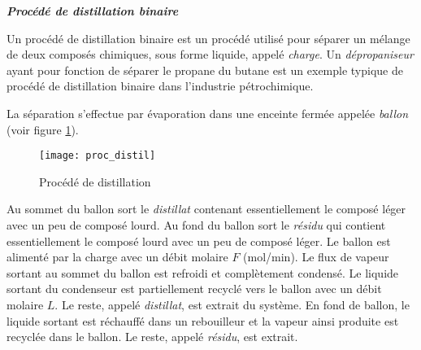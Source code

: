 \begin{exemple}{\bf \em Procédé de distillation binaire}

Un procédé de distillation binaire est un procédé utilisé pour séparer un
mélange de deux composés chimiques, sous forme liquide, appelé {\em charge}. Un {\it
dépropaniseur} ayant pour fonction de séparer le propane du butane est un
exemple typique de procédé de distillation binaire dans l'industrie pétrochimique.

La séparation s'effectue par évaporation dans une enceinte fermée appelée {\em ballon} (voir figure \ref{Fig:distillation}).
\begin{figure}[h]
\begin{center}
\texttt{[image: proc\_distil]}
\caption{Procédé de distillation}
\label{Fig:distillation}
\end{center} 
\end{figure}
Au sommet du ballon sort le {\it distillat} contenant essentiellement le composé léger avec
un peu de composé lourd. Au fond du ballon sort le {\it résidu} qui contient
essentiellement le composé lourd avec un peu de composé léger. Le ballon est alimenté par la charge avec un débit molaire $F$ (mol/min). Le flux de vapeur sortant au sommet du ballon est refroidi et complètement condensé. Le liquide
sortant du condenseur est partiellement recyclé vers le ballon avec un débit
molaire $L$. Le reste, appelé {\it distillat}, est extrait du système. En fond de
ballon, le liquide sortant est
réchauffé dans un rebouilleur et la vapeur ainsi produite est recyclée dans le ballon.  Le reste, appelé {\it résidu}, est extrait.


\end{exemple}
